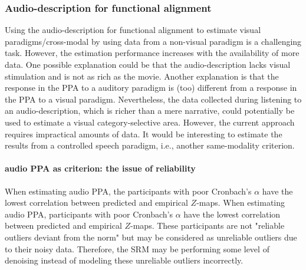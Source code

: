 \subsubsection{Audio-description for functional alignment}


%
Using the audio-description for functional alignment to estimate visual
paradigms/cross-modal by using data from a non-visual paradigm is a challenging
task.
%
However, the estimation performance increases with the availability of
more data.
%
One possible explanation could be that the audio-description lacks visual
stimulation and is not as rich as the movie.
%
Another explanation is that the response in the PPA to a auditory paradigm is
(too) different from a response in the PPA to a visual paradigm.
%
Nevertheless, the data collected during listening to an audio-description, which
is richer than a mere narrative, could potentially be used to estimate a visual
category-selective area. However, the current approach requires impractical
amounts of data.
%
It would be interesting to estimate the results from a controlled speech
paradigm, i.e., another same-modality criterion.


\paragraph{audio PPA as criterion: the issue of reliability}



%
When estimating audio PPA, the participants with poor Cronbach's $\alpha$ have
the lowest correlation between predicted and empirical $Z$-maps.
%
When estimating audio PPA, participants with poor Cronbach's $\alpha$ have the
lowest correlation between predicted and empirical $Z$-maps.
%
These participants are not "reliable outliers deviant from the norm" but may be
considered as unreliable outliers due to their noisy data.
%
Therefore, the SRM may be performing some level of denoising instead of modeling
these unreliable outliers incorrectly.

